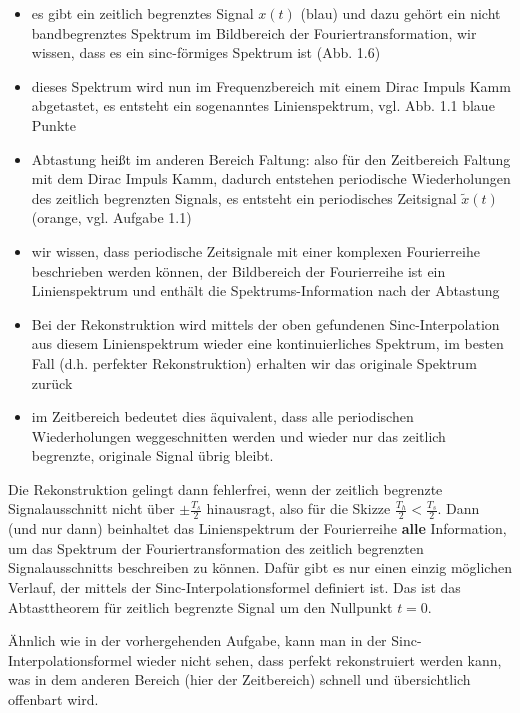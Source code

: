 \begin{itemize}
  \item es gibt ein zeitlich begrenztes Signal $x(t)$ (blau)
  und dazu gehört ein nicht bandbegrenztes Spektrum im Bildbereich der
  Fouriertransformation, wir wissen, dass es ein sinc-förmiges Spektrum ist (Abb. 1.6)
  \item dieses Spektrum wird nun im Frequenzbereich mit einem Dirac Impuls Kamm
  abgetastet, es entsteht ein sogenanntes Linienspektrum, vgl. Abb. 1.1 blaue Punkte
  \item Abtastung heißt im anderen Bereich Faltung:
  also für den Zeitbereich Faltung mit dem Dirac Impuls Kamm, dadurch
  entstehen periodische Wiederholungen
  des zeitlich begrenzten Signals, es entsteht ein periodisches Zeitsignal
  $\tilde{x}(t)$ (orange, vgl. Aufgabe 1.1)
  \item wir wissen, dass periodische Zeitsignale mit einer
  komplexen Fourierreihe beschrieben werden können, der Bildbereich der Fourierreihe
  ist ein Linienspektrum und enthält die Spektrums-Information nach der Abtastung
  \item Bei der Rekonstruktion wird mittels der oben gefundenen Sinc-Interpolation
  aus diesem Linienspektrum wieder eine kontinuierliches Spektrum, im besten
  Fall (d.h. perfekter Rekonstruktion) erhalten wir das originale Spektrum zurück
  \item im Zeitbereich bedeutet dies äquivalent, dass alle periodischen
  Wiederholungen weggeschnitten werden und wieder nur das zeitlich begrenzte,
  originale Signal übrig bleibt.
\end{itemize}
Die Rekonstruktion gelingt dann fehlerfrei, wenn der zeitlich begrenzte
Signalausschnitt nicht über $\pm \frac{T_s}{2}$ hinausragt, also für die Skizze
$\frac{T_h}{2}<\frac{T_s}{2}$. Dann (und nur dann)
beinhaltet das Linienspektrum der Fourierreihe \textbf{alle} Information,
um das Spektrum der Fouriertransformation
des zeitlich begrenzten Signalausschnitts beschreiben zu können. Dafür gibt es
nur einen einzig möglichen Verlauf, der mittels der Sinc-Interpolationsformel
definiert ist. Das ist das Abtasttheorem für zeitlich begrenzte Signal um den
Nullpunkt $t=0$.

Ähnlich wie in der vorhergehenden Aufgabe, kann man in der Sinc-Interpolationsformel
wieder nicht sehen, dass perfekt rekonstruiert werden kann, was in dem anderen
Bereich (hier der Zeitbereich) schnell und übersichtlich offenbart wird.

\newpage
